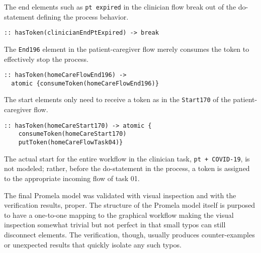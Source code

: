 The end elements such as \texttt{pt expired} in the clinician flow break out of the do-statement defining the process behavior.
%
{\small
\begin{lstlisting}[style=myPromela]
:: hasToken(clinicianEndPtExpired) -> break
\end{lstlisting}
}
%
\noindent The \texttt{End196} element in the patient-caregiver flow merely consumes the token to effectively stop the process.
%
{\small
\begin{lstlisting}[style=myPromela]
:: hasToken(homeCareFlowEnd196) -> 
  atomic {consumeToken(homeCareFlowEnd196)}
\end{lstlisting}
}
% 
\noindent The start elements only need to receive a token as in the \texttt{Start170} of the patient-caregiver flow.
%
{\small
\begin{lstlisting}[style=myPromela]
:: hasToken(homeCareStart170) -> atomic {
    consumeToken(homeCareStart170)
    putToken(homeCareFlowTask04)}
\end{lstlisting}
}
% 
\noindent The actual start for the entire workflow in the clinician task, \texttt{pt + COVID-19}, is not modeled;
rather, before the do-statement in the process, a token is assigned to the appropriate incoming flow of task 01.

The final Promela model was validated with visual inspection and with the verification results, proper.
The structure of the Promela model itself is purposed to have a one-to-one mapping to the graphical workflow making the visual inspection somewhat trivial but not perfect in that small typos can still disconnect elements.
The verification, though, usually produces counter-examples or unexpected results that quickly isolate any such typos.
